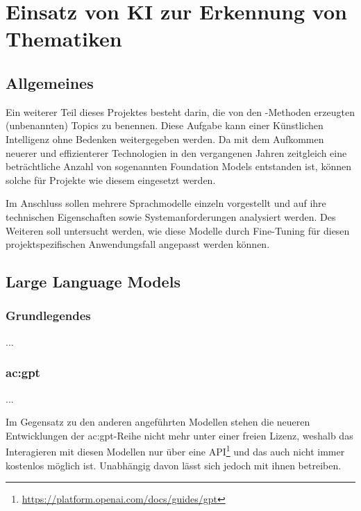 \section{Einsatz von KI zur Erkennung von Thematiken}\label{sec:ai-recognition}

\subsection{Allgemeines}

Ein weiterer Teil dieses Projektes besteht darin, die von den -Methoden erzeugten (unbenannten) Topics zu benennen. Diese Aufgabe kann einer Künstlichen Intelligenz ohne Bedenken weitergegeben werden. Da mit dem Aufkommen neuerer und effizienterer Technologien in den vergangenen Jahren zeitgleich eine beträchtliche Anzahl von sogenannten \glspl{Foundation Model} entstanden ist, können solche für Projekte wie diesem eingesetzt werden.

\smallskip\par\noindent
Im Anschluss sollen mehrere Sprachmodelle einzeln vorgestellt und auf ihre technischen Eigenschaften sowie Systemanforderungen analysiert werden. Des Weiteren soll untersucht werden, wie diese Modelle durch Fine-Tuning für diesen projektspezifischen Anwendungsfall angepasst werden können.

\subsection{Large Language Models}

\subsubsection{Grundlegendes}

...

\subsubsection{\acrfull{ac:gpt}}\label{sec:gpt}

...

\smallskip\par\noindent
Im Gegensatz zu den anderen angeführten Modellen stehen die neueren Entwicklungen der \acrshort{ac:gpt}-Reihe nicht mehr unter einer freien Lizenz, weshalb das Interagieren mit diesen Modellen nur über eine API\footnote{\url{https://platform.openai.com/docs/guides/gpt}} und das auch nicht immer kostenlos möglich ist. Unabhängig davon lässt sich jedoch  mit ihnen betreiben.


